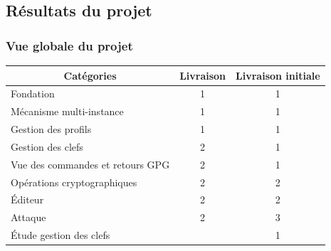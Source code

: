   \subsection{Résultats du projet}
  \begin{frame}
    \frametitle{\color{white}Vue globale du projet}
  \begin{tabular}{|l|l|l|}
    \hline
    \multicolumn{1}{|c|}{\cellcolor{gray} \color{white}Catégories} & \multicolumn{1}{|c|}{\cellcolor{gray} \color{white}Livraison} & \multicolumn{1}{|c|}{\cellcolor{gray} \color{white}Livraison initiale} \\
    \hline
    \cellcolor{white}\color{green}Fondation & \multicolumn{1}{|c|}{\cellcolor{white}\color{black}1} & \multicolumn{1}{|c|}{\cellcolor{white}\color{black}1} \\
    \hline
    \cellcolor{white}\color{green}Mécanisme multi-instance & \multicolumn{1}{|c|}{\cellcolor{white}\color{black}1} & \multicolumn{1}{|c|}{\cellcolor{white}\color{black}1} \\    
    \hline
    \cellcolor{white}\color{green}Gestion des profils & \multicolumn{1}{|c|}{\cellcolor{white}\color{black}1} & \multicolumn{1}{|c|}{\cellcolor{white}\color{black}1} \\
    \hline
    \cellcolor{white}\color{yellow}Gestion des clefs & \multicolumn{1}{|c|}{\cellcolor{white}\color{black}2} & \multicolumn{1}{|c|}{\cellcolor{white}\color{black}1} \\
    \hline
    \cellcolor{white}\color{green}Vue des commandes et retours GPG & \multicolumn{1}{|c|}{\cellcolor{white}\color{black}2} & \multicolumn{1}{|c|}{\cellcolor{white}\color{black}1} \\
    \hline
    \cellcolor{white}\color{yellow}Opérations cryptographiques & \multicolumn{1}{|c|}{\cellcolor{white}\color{black}2} & \multicolumn{1}{|c|}{\cellcolor{white}\color{black}2} \\
    \hline
    \cellcolor{white}\color{yellow}\'{E}diteur & \multicolumn{1}{|c|}{\cellcolor{white}\color{black}2} & \multicolumn{1}{|c|}{\cellcolor{white}\color{black}2} \\
    \hline
    \cellcolor{white}\color{red}Attaque & \multicolumn{1}{|c|}{\cellcolor{white}\color{black}2} & \multicolumn{1}{|c|}{\cellcolor{white}\color{black}3} \\
    \hline
    \cellcolor{white}\color{red}\'{E}tude gestion des clefs & \multicolumn{1}{|c|}{\cellcolor{white}\color{black}} & \multicolumn{1}{|c|}{\cellcolor{white}\color{black}1} \\

\end{tabular}
\end{frame}
